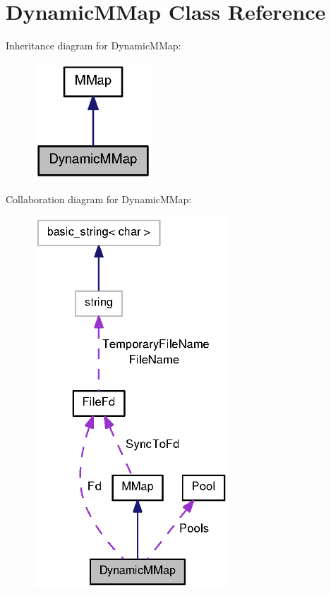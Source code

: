 \section{\-Dynamic\-M\-Map \-Class \-Reference}
\label{classDynamicMMap}


\-Inheritance diagram for \-Dynamic\-M\-Map\-:
\nopagebreak
\begin{figure}[H]
\begin{center}
\leavevmode
\includegraphics[width=126pt]{classDynamicMMap__inherit__graph}
\end{center}
\end{figure}


\-Collaboration diagram for \-Dynamic\-M\-Map\-:
\nopagebreak
\begin{figure}[H]
\begin{center}
\leavevmode
\includegraphics[width=207pt]{classDynamicMMap__coll__graph}
\end{center}
\end{figure}
